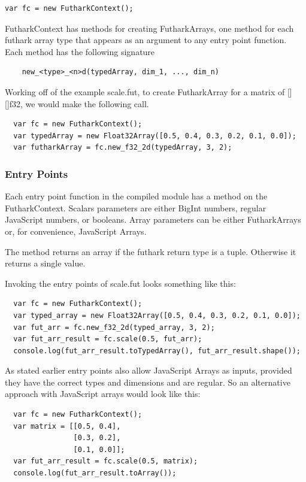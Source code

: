 \documentclass[11pt]{book}
\begin{document}
\begin{verbatim}
var fc = new FutharkContext();
\end{verbatim}
 
FutharkContext has methods for creating FutharkArrays, one method for each futhark array type that appears as an argument to any entry point function. Each method has the following signature
\begin{verbatim}
    new_<type>_<n>d(typedArray, dim_1, ..., dim_n) 
\end{verbatim}

Working off of the example scale.fut, to create FutharkArray for a matrix of [][]f32, we would make the following call. 

\begin{verbatim}
  var fc = new FutharkContext();
  var typedArray = new Float32Array([0.5, 0.4, 0.3, 0.2, 0.1, 0.0]);
  var futharkArray = fc.new_f32_2d(typedArray, 3, 2);
\end{verbatim}

\subsubsection*{Entry Points}
Each entry point function in the compiled module has a method on the FutharkContext. Scalars parameters are either BigInt numbers, regular JavaScript numbers, or booleans. Array parameters can be either FutharkArrays or, for convenience, JavaScript Arrays.

The method returns an array if the futhark return type is a tuple. Otherwise it returns a single value.

Invoking the entry points of scale.fut looks something like this:

\begin{verbatim}
  var fc = new FutharkContext();
  var typed_array = new Float32Array([0.5, 0.4, 0.3, 0.2, 0.1, 0.0]);
  var fut_arr = fc.new_f32_2d(typed_array, 3, 2);
  var fut_arr_result = fc.scale(0.5, fut_arr);
  console.log(fut_arr_result.toTypedArray(), fut_arr_result.shape());
\end{verbatim}

As stated earlier entry points also allow JavaScript Arrays as inputs, provided they have the correct types and dimensions and are regular. So an alternative approach with JavaScript arrays would look like this:

\begin{verbatim}
  var fc = new FutharkContext();
  var matrix = [[0.5, 0.4], 
                [0.3, 0.2],
                [0.1, 0.0]];
  var fut_arr_result = fc.scale(0.5, matrix);
  console.log(fut_arr_result.toArray());
\end{verbatim}
\end{document}
